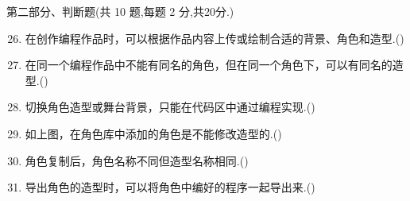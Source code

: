 \documentclass[10pt, a4paper]{article}
\begin{document}
    {\noindent\heiti 第二部分、判断题(共 10 题,每题 2 分,共20分.)}
    \begin{enumerate}
        \setcounter{enumi}{25}
        \item 在创作编程作品时，可以根据作品内容上传或绘制合适的背景、角色和造型.(\qquad)

        \item 在同一个编程作品中不能有同名的角色，但在同一个角色下，可以有同名的造型.(\qquad)
        
        \item 切换角色造型或舞台背景，只能在代码区中通过编程实现.(\qquad)
  
        \item 如上图，在角色库中添加的角色是不能修改造型的.(\qquad)
        
        \item 角色复制后，角色名称不同但造型名称相同.(\qquad)
        
        \item 导出角色的造型时，可以将角色中编好的程序一起导出来.(\qquad)
        
        

\end{enumerate}
\end{document}
